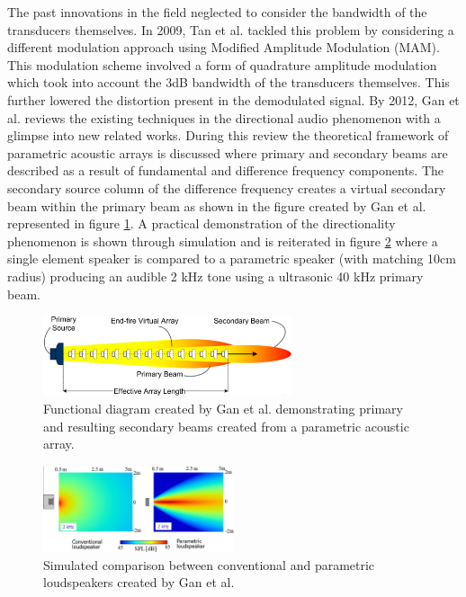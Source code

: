 The past innovations in the field neglected to consider the bandwidth of the transducers themselves. In 2009, Tan et al. \cite{tan2010preprocessing} tackled this problem by considering a different modulation approach using Modified Amplitude Modulation (MAM). This modulation scheme involved a form of quadrature amplitude modulation which took into account the 3dB bandwidth of the transducers themselves. This further lowered the distortion present in the demodulated signal. By 2012, Gan et al. \cite{gan2012review} reviews the existing techniques in the directional audio phenomenon with a glimpse into new related works. During this review the theoretical framework of parametric acoustic arrays is discussed where primary and secondary beams are described as a result of fundamental and difference frequency components. The secondary source column of the difference frequency creates a virtual secondary beam within the primary beam as shown in the figure created by Gan et al. represented in figure \ref{fig:ganprisec}\cite{gan2012review}. A practical demonstration of the directionality phenomenon is shown through simulation and is reiterated in figure \ref{fig:gandirectionality}\cite{gan2012review} where a single element speaker is compared to a parametric speaker (with matching 10cm radius) producing an audible 2 kHz tone using a ultrasonic 40 kHz primary beam.
\begin{figure}[ht!]
    \centering
    \includegraphics[width=0.65\textwidth]{Figures/primsecbeamarrayGan2012review.png}
    \caption{Functional diagram created by Gan et al. demonstrating primary and resulting secondary beams created from a parametric acoustic array.}
    \label{fig:ganprisec}
\end{figure}
\begin{figure}[ht!]
    \centering
    \includegraphics[width=0.5\textwidth]{Figures/2khzDirectionalitygan2012review.png}
    \caption{Simulated comparison between conventional and parametric loudspeakers created by Gan et al.}
    \label{fig:gandirectionality}
\end{figure}

